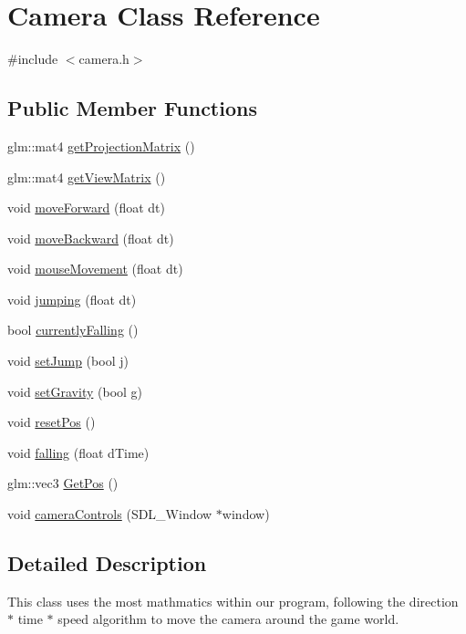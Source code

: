 \hypertarget{classCamera}{\section{Camera Class Reference}
\label{classCamera}
}


{\ttfamily \#include $<$camera.\-h$>$}

\subsection*{Public Member Functions}
\begin{DoxyCompactItemize}
\item 
glm\-::mat4 \hyperlink{classCamera_adf09522521723786b9f405c99d6594c7}{get\-Projection\-Matrix} ()
\item 
glm\-::mat4 \hyperlink{classCamera_a5569ca5967e01d3344fbf6aba36d9820}{get\-View\-Matrix} ()
\item 
void \hyperlink{classCamera_a3be70f5bbcb806eb902a82dbb17e6bc3}{move\-Forward} (float dt)
\item 
void \hyperlink{classCamera_a3aa8d25c1e36af10fac1f749a1bb420e}{move\-Backward} (float dt)
\item 
void \hyperlink{classCamera_a4ec8b9654ae4fa6274920891321899b7}{mouse\-Movement} (float dt)
\item 
void \hyperlink{classCamera_a4d12c50b0d5306860f4e1493374e6fc9}{jumping} (float dt)
\item 
bool \hyperlink{classCamera_a08f5ef4dc4d503d539635a6bd80bd095}{currently\-Falling} ()
\item 
void \hyperlink{classCamera_a6889ceabc0a2d71fa0eb83268d628b94}{set\-Jump} (bool j)
\item 
void \hyperlink{classCamera_aea3ceffb4ff1a209995820e20910f21f}{set\-Gravity} (bool g)
\item 
void \hyperlink{classCamera_a6165c2b248c2675194dd6505b0099cf2}{reset\-Pos} ()
\item 
void \hyperlink{classCamera_ace63ab83e5ec884fee9d2acad85dde03}{falling} (float d\-Time)
\item 
glm\-::vec3 \hyperlink{classCamera_ab779e5b58cc0cddcd0738a13d82aa523}{Get\-Pos} ()
\item 
void \hyperlink{classCamera_a0edb621b581804dcd1ed129082045f7e}{camera\-Controls} (S\-D\-L\-\_\-\-Window $\ast$window)
\end{DoxyCompactItemize}


\subsection{Detailed Description}
This class uses the most mathmatics within our program, following the direction $\ast$ time $\ast$ speed algorithm to move the camera around the game world. 


